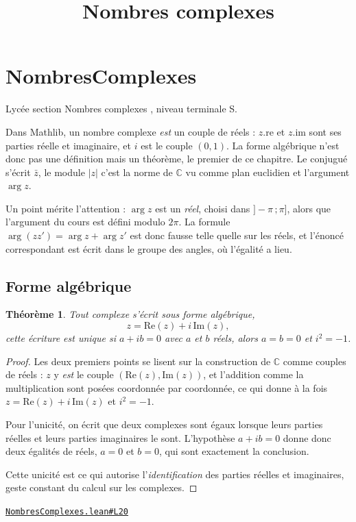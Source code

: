 \documentclass[11pt,a4paper]{article}
\title{Nombres complexes}
\date{}
\theoremstyle{definition}
\theoremstyle{plain}
\newtheorem{theoreme}{Théorème}
\newcommand{\source}[2]{\par\smallskip\noindent\hfill{\footnotesize\href{#1}{\texttt{#2}}}\par\smallskip}
\begin{document}
\maketitle
\sloppy

\section{NombresComplexes}

\noindent
Lycée \textemdash{} section \og{} Nombres complexes \fg{}, niveau terminale S.

\medskip\noindent
Dans Mathlib, un nombre complexe \emph{est} un couple de réels : $z.\mathrm{re}$ et
$z.\mathrm{im}$ sont ses parties réelle et imaginaire, et $i$ est le couple $(0, 1)$. La
forme algébrique n'est donc pas une définition mais un théorème, le premier de ce
chapitre. Le conjugué s'écrit $\bar z$, le module $|z|$ \textemdash{} c'est la norme de
$\mathbb{C}$ vu comme plan euclidien \textemdash{} et l'argument $\arg z$.

\medskip\noindent
Un point mérite l'attention : $\arg z$ est un \emph{réel}, choisi dans
$]-\pi\,;\pi]$, alors que l'argument du cours est défini modulo $2\pi$. La formule
$\arg(zz') = \arg z + \arg z'$ est donc fausse telle quelle sur les réels, et l'énoncé
correspondant est écrit dans le groupe des angles, où l'égalité a lieu.

\subsection{Forme algébrique}

\begin{theoreme}
Tout complexe s'écrit sous forme algébrique,
\[ z = \mathrm{Re}(z) + i\,\mathrm{Im}(z) , \]
cette écriture est unique \textemdash{} si $a + ib = 0$ avec $a$ et $b$ réels, alors
$a = b = 0$ \textemdash{} et $i^{2} = -1$.
\end{theoreme}

\begin{proof}
Les deux premiers points se lisent sur la construction de $\mathbb{C}$ comme couples de
réels : $z$ y \emph{est} le couple $(\mathrm{Re}(z), \mathrm{Im}(z))$, et l'addition comme
la multiplication sont posées coordonnée par coordonnée, ce qui donne à la fois
$z = \mathrm{Re}(z) + i\,\mathrm{Im}(z)$ et $i^{2} = -1$.

Pour l'unicité, on écrit que deux complexes sont égaux lorsque leurs parties réelles et
leurs parties imaginaires le sont. L'hypothèse $a + ib = 0$ donne donc deux égalités de
réels, $a = 0$ et $b = 0$, qui sont exactement la conclusion.

\medskip\noindent
Cette unicité est ce qui autorise l'\emph{identification} des parties réelles et
imaginaires, geste constant du calcul sur les complexes.
\end{proof}
\source{https://github.com/Commutator-IO/learn-lean/blob/main/courses/02-lycee/07-nombres-complexes/NombresComplexes.lean\#L20}{NombresComplexes.lean\#L20}
\end{document}
